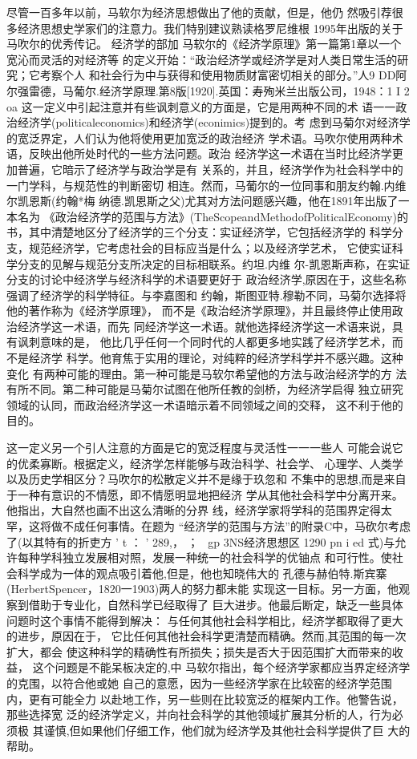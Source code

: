 尽管一百多年以前，马软尔为经济思想做出了他的贡献，但是，他仍
然吸引荐很多经济思想史学家们的注意力。我们特别建议熟读格罗尼维根
1995年出版的关于马吹尔的优秀传记。
经济学的部加
马软尔的《经济学原理》第一篇第1章以一个宽沁而灵活的对经济等
的定义开始：“政治经济学或经济学是对人类日常生活的研究；它考察个人
和社会行为中与获得和使用物质财富密切相关的部分。”人9
DD阿尔强雷德，马葡尔.经济学原理.第8版[1920].英国：寿殉米兰出版公司，1948：1
I
2
oa
这一定义中引起注意并有些讽刺意义的方面是，它是用两种不同的术
语一一政治经济学(politicaleconomics)和经济学(econimics)提到的。考
虑到马菊尔对经济学的宽泛界定，人们认为他将使用更加宽泛的政治经济
学术语。马吹尔使用两种术语，反映出他所处时代的一些方法问题。政治
经济学这一术语在当时比经济学更加普遍，它暗示了经济学与政治学是有
关系的，并且，经济学作为社会科学中的一门学科，与规范性的判断密切
相连。然而，马葡尔的一位同事和朋友约翰.内维尔凯恩斯(约翰*梅
纳德.凯恩斯之父)尤其对方法问题感兴趣，他在1891年出版了一本名为
《政治经济学的范围与方法》(TheScopeandMethodofPoliticalEconomy)的
书，其中清楚地区分了经济学的三个分支：实证经济学，它包括经济学的
科学分支，规范经济学，它考虑社会的目标应当是什么；以及经济学艺术，
它使实证科学分支的见解与规范分支所决定的目标相联系。约坦.内维
尔-凯恩斯声称，在实证分支的讨论中经济学与经济科学的术语要更好于
政治经济学,原因在于，这些名称强调了经济学的科学特征。与李嘉图和
约翰，斯图亚特.穆勒不同，马菊尔选择将他的著作称为《经济学原理》，
而不是《政治经济学原理》，并且最终停止使用政治经济学这一术语，而先
同经济学这一术语。就他选择经济学这一术语来说，具有讽刺意味的是，
他比几乎任何一个同时代的人都更多地实践了经济学艺术，而不是经济学
科学。他育焦于实用的理论，对纯粹的经济学科学并不感兴趣。这种变化
有两种可能的理由。第一种可能是马软尔希望他的方法与政治经济学的方
法有所不同。第二种可能是马菊尔试图在他所任教的剑桥，为经济学启得
独立研究领域的认同，而政治经济学这一术语暗示着不同领域之间的交释，
这不利于他的目的。

这一定义另一个引人注意的方面是它的宽泛程度与灵活性一一一些人
可能会说它的优柔寡断。根据定义，经济学怎样能够与政治科学、社会学、
心理学、人类学以及历史学相区分？马吹尔的松散定义并不是缘于玖忽和
不集中的思想,而是来自于一种有意识的不情愿，即不情愿明显地把经济
学从其他社会科学中分离开来。他指出，大自然也画不出这么清晰的分界
线，经济学家将学科的范围界定得太罕，这将做不成任何事情。在题为
“经济学的范围与方法”的附录C中，马砍尔考虑了(以其特有的折吏方
'
t
：
'
289,，
；
~gp
3NS经济思想区
1290
pn
i
ed
式)与允许每种学科独立发展相对照，发展一种统一的社会科学的优铀点
和可行性。使社会科学成为一体的观点吸引着他,但是，他也知晓伟大的
孔德与赫伯特.斯宾寨(HerbertSpencer，1820一1903)两人的努力都未能
实现这一目标。另一方面，他观察到借助于专业化，自然科学已经取得了
巨大进步。他最后断定，缺乏一些具体问题时这个事情不能得到解决：
与任何其他社会科学相比，经济学都取得了更大的进步，原因在于，
它比任何其他社会科学更清楚而精确。然而,其范围的每一次扩大，都会
使这种科学的精确性有所损失；损失是否大于因范围扩大而带来的收益，
这个问题是不能呆板决定的,中
马软尔指出，每个经济学家都应当界定经济学的克围，以符合他或她
自己的意愿，因为一些经济学家在比较窑的经济学范围内，更有可能全力
以赴地工作，另一些则在比较宽泛的框架内工作。他警告说，那些选择宽
泛的经济学定义，并向社会科学的其他领域扩展其分析的人，行为必须极
其谨慎,但如果他们仔细工作，他们就为经济学及其他社会科学提供了巨
大的帮助。

